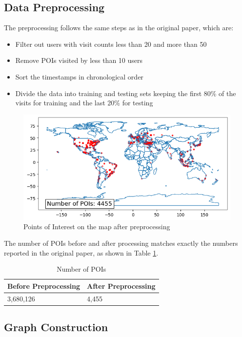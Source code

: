 \documentclass[twocolumn]{article}
\begin{document}
 \subsection{Data Preprocessing}
 The preprocessing follows the same steps as in the original paper, which are:
  \begin{itemize}
      \item Filter out users with visit counts less than 20 and more than 50
      \item Remove POIs visited by less than 10 users
      \item Sort the timestamps in chronological order
      \item Divide the data into training and testing sets keeping the first 80\% of the visits for training and the last 20\% for testing
  \end{itemize}
  \begin{figure}
    \centering
    \includegraphics[width=1\linewidth]{poi_after_processing.png}
    \caption{Points of Interest on the map after preprocessing}
    \label{fig:preprocessed_data}
  \end{figure}
  The number of POIs before and after processing matches exactly 
  the numbers reported in the original paper, as shown in Table \ref{tab:poidata}.
  \begin{table}
    \caption{Number of POIs}
     \centering
     \begin{tabular}{ll}
       \toprule
        Before Preprocessing & After Preprocessing \\
        \midrule
        \cmidrule(r){2-2}
        3,680,126 & 4,455 \\
       \bottomrule
     \end{tabular}
     \label{tab:poidata}
   \end{table}

 \subsection{Graph Construction}
\end{document}

